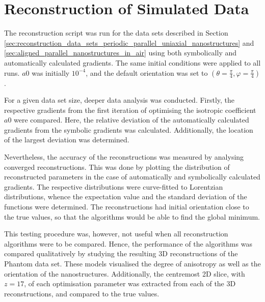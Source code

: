 

\section{Reconstruction of Simulated Data}\label{sec:pp_nanostructures_reconstruction}


The reconstruction script was run for the data sets described in Section \ref{sec:reconstruction_data_sets_periodic_parallel_uniaxial_nanostructures} and \ref{sec:aligned_parallel_nanostructures_in_air}
using both symbolically and automatically calculated gradients.
The same initial conditions were applied to all runs.
$a0$ was initially $10^{-4}$, and the default orientation was set to $\left( \theta = \frac{\pi}{4}, \varphi = \frac{\pi}{4} \right)$.

For a given data set size, deeper data analysis was conducted.
Firstly, the respective gradients from the first iteration of optimising the isotropic coefficient $a0$ were compared.
Here, the relative deviation of the automatically calculated gradients from the symbolic gradients was calculated.
Additionally, the location of the largest deviation was determined.

Nevertheless, the accuracy of the reconstructions was measured by analysing converged reconstructions.
This was done by plotting the distribution of reconstructed parameters in the case of automatically and symbolically calculated gradients.
The respective distributions were curve-fitted to Lorentzian distributions, whence the expectation value and the standard deviation of the functions were determined.
The reconstructions had initial orientation close to the true values, so that the algorithms would be able to find the global minimum.

This testing procedure was, however, not useful when all reconstruction algorithms were to be compared.
Hence, the performance of the algorithms was compared qualitatively by studying the resulting 3D reconstructions of the Phantom data set.
These models visualised the degree of anisotropy as well as the orientation of the nanostructures.
Additionally, the centremost 2D slice, with $z = 17$, of each optimisation parameter was extracted from each of the 3D reconstructions, and compared to the true values.

